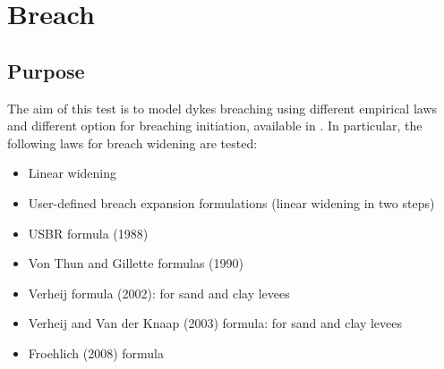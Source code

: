 \chapter{Breach}
%


\section{Purpose}
The aim of this test is to model dykes breaching using different empirical laws and different option for breaching initiation, available in .
In particular, the following laws for breach widening are tested:
\begin{itemize}
\item Linear widening \\
\item User-defined breach expansion formulations (linear widening in two steps) \\
\item USBR formula (1988) \\
\item Von Thun and Gillette formulas (1990) \\
\item Verheij formula (2002): for sand and clay levees\\
\item Verheij and Van der Knaap (2003) formula: for sand and clay levees \\
\item Froehlich (2008) formula
\end{itemize}


